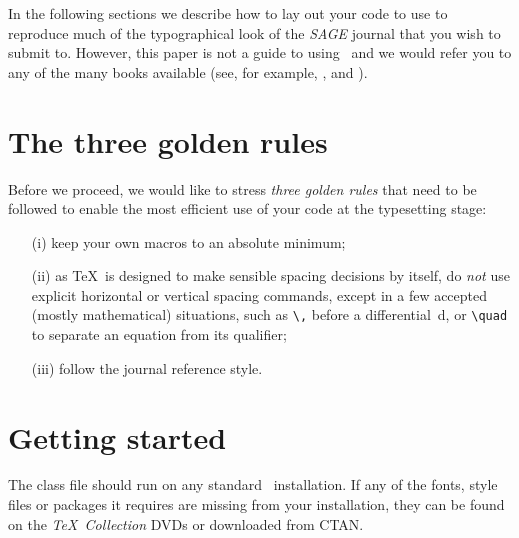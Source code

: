 \documentclass[Afour,sageh,times]{sagej}
\begin{document}
In the following sections we describe how to lay out your code to
use \textsf{\journalclass} to reproduce much of the typographical look of
the \textit{SAGE} journal that you wish to submit to. However, this paper is not a guide to
using \LaTeXe\ and we would refer you to any of the many books
available (see, for example, \cite{R1}, \cite{R2} and \cite{R3}).

\section{The three golden rules}
Before we proceed, we would like to stress \textit{three golden
rules} that need to be followed to enable the most efficient use
of your code at the typesetting stage:
\begin{enumerate}
\item[(i)] keep your own macros to an absolute minimum;

\item[(ii)] as \TeX\ is designed to make sensible spacing
decisions by itself, do \textit{not} use explicit horizontal or
vertical spacing commands, except in a few accepted (mostly
mathematical) situations, such as \verb"\," before a
differential~d, or \verb"\quad" to separate an equation from its
qualifier;

\item[(iii)] follow the journal reference style.
\end{enumerate}

\section{Getting started} The \textsf{\journalclassshort} class file should run
on any standard \LaTeXe\ installation. If any of the fonts, style
files or packages it requires are missing from your installation,
they can be found on the \textit{\TeX\ Collection} DVDs or downloaded from
CTAN.
\end{document}
